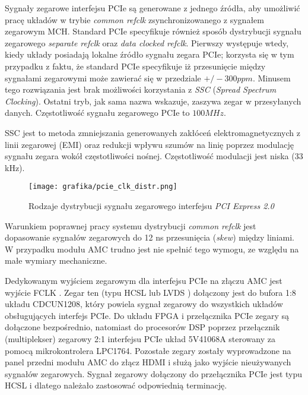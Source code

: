 Sygnały zegarowe interfejsu PCIe są generowane z jednego źródła, aby umożliwić pracę układów w trybie \textit{common refclk} zsynchronizowanego z sygnałem zegarowym MCH. Standard PCIe specyfikuje również sposób dystrybucji sygnału zegarowego \textit{separate refclk} oraz \textit{data clocked refclk}. Pierwszy występuje wtedy, kiedy układy posiadają lokalne źródło sygnału zegara PCIe; korzysta się w tym przypadku z faktu, że standard PCIe specyfikuje iż przesunięcie między sygnałami zegarowymi może zawierać się w przedziale $+/- 300 ppm$. Minusem tego rozwiązania jest brak możliwości korzystania z \textit{SSC} (\textit{Spread Spectrum Clocking}). Ostatni tryb, jak sama nazwa wskazuje, zaszywa zegar w przesyłanych danych. Częstotliwość sygnału zegarowego PCIe to $100 MHz$.

SSC jest to metoda zmniejszania generowanych zakłóceń elektromagnetycznych z linii zegarowej (EMI) oraz redukcji wpływu szumów na linię poprzez modulację sygnału zegara wokół częstotliwości nośnej. Częstotliwość modulacji jest niska (33 kHz).

 \begin{figure}[here]
\begin{center}
\texttt{[image: grafika/pcie\_clk\_distr.png]}
\caption{Rodzaje dystrybucji sygnału zegarowego interfejsu \textit{PCI Express 2.0}}
\end{center}
\end{figure}

Warunkiem poprawnej pracy systemu dystrybucji \textit{common refclk} jest dopasowanie sygnałów zegarowych do 12 ns przesunięcia (\textit{skew}) \cite{PCIE_REF_CLK} między liniami. W przypadku modułu AMC trudno jest nie spełnić tego wymogu, ze względu na małe wymiary mechaniczne.

Dedykowanym wyjściem zegarowym dla interfejsu PCIe na złączu AMC jest wyjście FCLK \cite{AMC_BASE}. Zegar ten (typu HCSL lub LVDS \cite{AMC_BASE}) dołączony jest do bufora 1:8 układu CDCUN1208, który powiela sygnał zegarowy do wszystkich układów obsługujących interfejs PCIe. Do układu FPGA i przełącznika PCIe zegary są dołączone bezpośrednio, natomiast do procesorów DSP poprzez przełącznik (multiplekser) zegarowy 2:1 interfejsu PCIe układ 5V41068A sterowany za pomocą mikrokontrolera LPC1764. Pozostałe zegary zostały wyprowadzone na panel przedni modułu AMC do złącz HDMI i służą jako wyjście nieużywanych sygnałów zegarowych.  Sygnał zegarowy dołączony do przełącznika PCIe jest typu HCSL i dlatego należało zastosować odpowiednią terminację.

